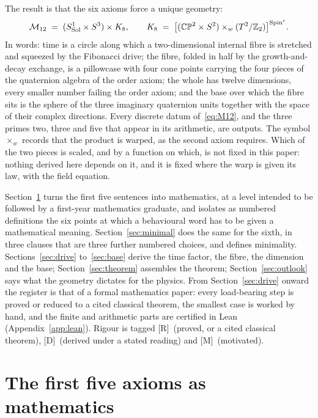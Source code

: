 \documentclass[11pt,a4paper]{article}
\theoremstyle{plain}
\theoremstyle{definition}
\theoremstyle{remark}
\newcommand{\Sol}{\mathrm{Sol}}
\newcommand{\rigR}{[\textup{R}]}
\newcommand{\rigD}{[\textup{D}]}
\newcommand{\rigM}{[\textup{M}]}
\begin{document}
The result is that the six axioms force a unique geometry:
\begin{equation}\label{eq:M12}
\Mtwelve \;=\; (S^{1}_{\Sol}\times S^{3})\times\Keight, \qquad
\Keight \;=\; \bigl[(\CPtwo\times\Stwo)\times_{w}(\Ttwo/\Ztwo)\bigr]^{\Spinc}.
\end{equation}
In words: time is a circle along which a two-dimensional internal fibre is stretched and squeezed by the Fibonacci drive; the fibre, folded in half by the growth-and-decay exchange, is a pillowcase with four cone points carrying the four pieces of the quaternion algebra of the order axiom; the whole has twelve dimensions, every smaller number failing the order axiom; and the base over which the fibre sits is the sphere of the three imaginary quaternion units together with the space of their complex directions. Every discrete datum of~\eqref{eq:M12}, and the three primes two, three and five that appear in its arithmetic, are outputs. The symbol $\times_{w}$ records that the product is warped, as the second axiom requires. Which of the two pieces is scaled, and by a function on which, is not fixed in this paper: nothing derived here depends on it, and it is fixed where the warp is given its law, with the field equation.

Section~\ref{sec:axioms} turns the first five sentences into mathematics, at a level intended to be followed by a first-year mathematics graduate, and isolates as numbered definitions the six points at which a behavioural word has to be given a mathematical meaning. Section~\ref{sec:minimal} does the same for the sixth, in three clauses that are three further numbered choices, and defines minimality. Sections~\ref{sec:drive} to~\ref{sec:base} derive the time factor, the fibre, the dimension and the base; Section~\ref{sec:theorem} assembles the theorem; Section~\ref{sec:outlook} says what the geometry dictates for the physics. From Section~\ref{sec:drive} onward the register is that of a formal mathematics paper: every load-bearing step is proved or reduced to a cited classical theorem, the smallest case is worked by hand, and the finite and arithmetic parts are certified in Lean (Appendix~\ref{app:lean}). Rigour is tagged \rigR\ (proved, or a cited classical theorem), \rigD\ (derived under a stated reading) and \rigM\ (motivated).

\section{The first five axioms as mathematics}\label{sec:axioms}
\end{document}
